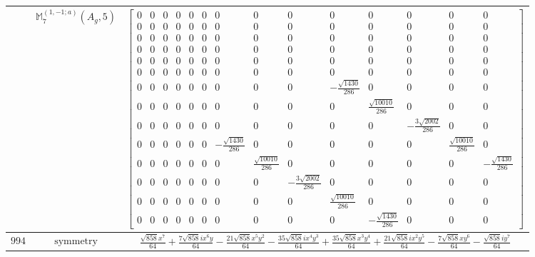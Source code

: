 \documentclass[fleqn,8pt,landscape]{jsarticle}
\begin{document}
\begin{longtable}{ccc}
$  $ & $ \mathbb{M}_{7}^{(1,-1;a)}(A_{g},5) $ & $ \begin{bmatrix} 0 & 0 & 0 & 0 & 0 & 0 & 0 & 0 & 0 & 0 & 0 & 0 & 0 & 0 \\ 0 & 0 & 0 & 0 & 0 & 0 & 0 & 0 & 0 & 0 & 0 & 0 & 0 & 0 \\ 0 & 0 & 0 & 0 & 0 & 0 & 0 & 0 & 0 & 0 & 0 & 0 & 0 & 0 \\ 0 & 0 & 0 & 0 & 0 & 0 & 0 & 0 & 0 & 0 & 0 & 0 & 0 & 0 \\ 0 & 0 & 0 & 0 & 0 & 0 & 0 & 0 & 0 & 0 & 0 & 0 & 0 & 0 \\ 0 & 0 & 0 & 0 & 0 & 0 & 0 & 0 & 0 & 0 & 0 & 0 & 0 & 0 \\ 0 & 0 & 0 & 0 & 0 & 0 & 0 & 0 & 0 & - \frac{\sqrt{1430}}{286} & 0 & 0 & 0 & 0 \\ 0 & 0 & 0 & 0 & 0 & 0 & 0 & 0 & 0 & 0 & \frac{\sqrt{10010}}{286} & 0 & 0 & 0 \\ 0 & 0 & 0 & 0 & 0 & 0 & 0 & 0 & 0 & 0 & 0 & - \frac{3 \sqrt{2002}}{286} & 0 & 0 \\ 0 & 0 & 0 & 0 & 0 & 0 & - \frac{\sqrt{1430}}{286} & 0 & 0 & 0 & 0 & 0 & \frac{\sqrt{10010}}{286} & 0 \\ 0 & 0 & 0 & 0 & 0 & 0 & 0 & \frac{\sqrt{10010}}{286} & 0 & 0 & 0 & 0 & 0 & - \frac{\sqrt{1430}}{286} \\ 0 & 0 & 0 & 0 & 0 & 0 & 0 & 0 & - \frac{3 \sqrt{2002}}{286} & 0 & 0 & 0 & 0 & 0 \\ 0 & 0 & 0 & 0 & 0 & 0 & 0 & 0 & 0 & \frac{\sqrt{10010}}{286} & 0 & 0 & 0 & 0 \\ 0 & 0 & 0 & 0 & 0 & 0 & 0 & 0 & 0 & 0 & - \frac{\sqrt{1430}}{286} & 0 & 0 & 0 \end{bmatrix} $ \\ \hline
$ 994 $ & $ \text{symmetry} $ & $ \frac{\sqrt{858} x^{7}}{64} + \frac{7 \sqrt{858} i x^{6} y}{64} - \frac{21 \sqrt{858} x^{5} y^{2}}{64} - \frac{35 \sqrt{858} i x^{4} y^{3}}{64} + \frac{35 \sqrt{858} x^{3} y^{4}}{64} + \frac{21 \sqrt{858} i x^{2} y^{5}}{64} - \frac{7 \sqrt{858} x y^{6}}{64} - \frac{\sqrt{858} i y^{7}}{64} $ \\

\end{longtable}
\end{document}
